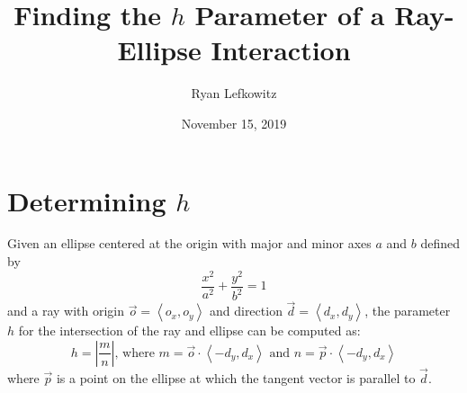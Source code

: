 \documentclass{article}
\title{Finding the $h$ Parameter of a Ray-Ellipse Interaction}
\author{Ryan Lefkowitz}
\date{November 15, 2019}
\newcommand{\rlvc}[1]{\left\langle#1\right\rangle}
\newcommand{\rlabs}[1]{\left|#1\right|}
\begin{document}
\maketitle

\section{Determining $h$}

\noindent Given an ellipse centered at the origin with major and minor axes $a$ and $b$ defined by
\begin{equation}
    \frac{x^2}{a^2} + \frac{y^2}{b^2} = 1
\end{equation}
and a ray with origin $\vec{o} = \rlvc{o_x, o_y}$ and direction $\vec{d} = \rlvc{d_x, d_y}$, the parameter $h$ for the intersection of the ray and ellipse can be computed as:
\begin{equation}
    h = \rlabs{\frac{m}{n}}\text{, where }m = \vec{o}\cdot\rlvc{-d_y, d_x}\text{ and }n =\vec{p}\cdot\rlvc{-d_y, d_x}
\end{equation}
where $\vec{p}$ is a point on the ellipse at which the tangent vector is parallel to $\vec{d}$.
\end{document}
